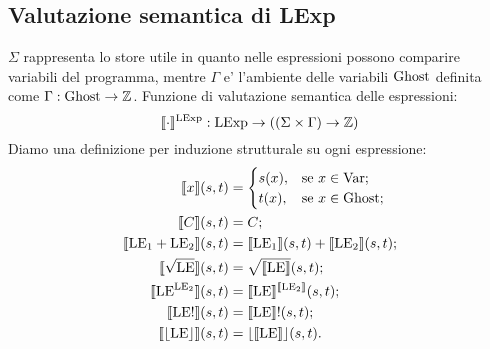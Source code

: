 \subsection{Valutazione semantica di LExp}
$\Sigma$ rappresenta lo store utile in quanto nelle espressioni possono comparire variabili del programma, mentre $\Gamma$ e' l'ambiente delle variabili $\mathrm{Ghost}$ definita come $\Gamma\mathrel{:}\mathrm{Ghost}\rightarrow\mathbb{Z}$. Funzione di valutazione semantica delle espressioni:
$$\llbracket\cdot\rrbracket ^{\mathrm{LExp}}: \mathrm{LExp} \rightarrow ((\Sigma \times \Gamma) \rightarrow \mathbb{Z})$$
Diamo una definizione per induzione strutturale su ogni espressione:
\begin{align*}
   \llbracket x \rrbracket(s,t) 
      &=
        \begin{cases}
                 s(x), &\text{se $x \in\mathrm{Var}$};\\
                 t(x), &\text{se $ x \in\mathrm{Ghost}$};
        \end{cases}\\
   \llbracket  C\rrbracket(s,t) 
     &=  C;\\
   \llbracket \mathrm{LE}{_1}+\mathrm{LE}{_2} \rrbracket(s,t) 
     &= \llbracket \mathrm{LE}{_1} \rrbracket(s,t) + \llbracket \mathrm{LE}{_2}\rrbracket( s, t);\\
   \llbracket \sqrt{\mathrm{LE}} \rrbracket(s,t) 
     &= \sqrt{\llbracket\mathrm{LE}\rrbracket}(s,t);\\
   \llbracket \mathrm{LE}^{\mathrm{LE}{_2}}\rrbracket(s,t) 
     &= \llbracket\mathrm{LE}\rrbracket^{\llbracket\mathrm{LE}{_2}\rrbracket}(s,t);\\
   \llbracket \mathrm{LE}!\rrbracket(s,t) 
     &= \llbracket\mathrm{LE}\rrbracket!(s,t);\\
   \llbracket \lfloor \mathrm{LE} \rfloor\rrbracket(s,t) 
     &= \lfloor\llbracket \mathrm{LE} \rrbracket\rfloor(s,t).
\end{align*}
